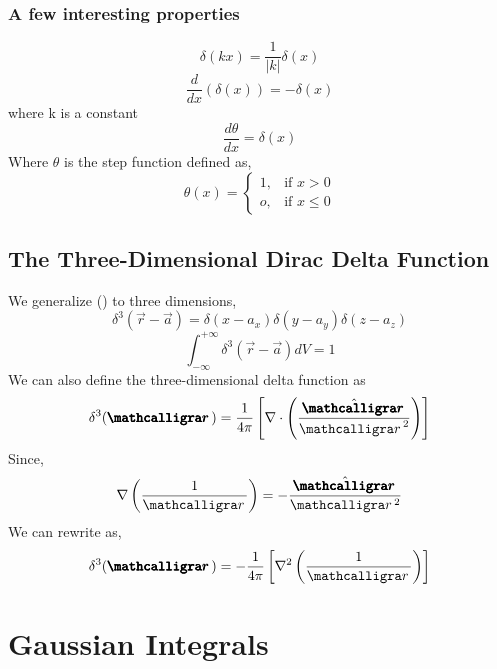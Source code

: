 \subsubsection{A few interesting properties}
\begin{equation}
\delta(kx) = \frac{1}{|k|}\delta(x)
\end{equation}
\begin{equation}
\frac{d}{dx}(\delta(x)) = -\delta(x)
\end{equation}
where k is a constant
\begin{equation}
\frac{d \theta}{dx} = \delta(x)
\end{equation}
Where $\theta$ is the step function defined as,
\begin{equation}
\theta(x)= 
\begin{cases}
1, & \text{if } x > 0\\
o,              & \text{if } x \leq 0
\end{cases}
\end{equation}

\subsection{The Three-Dimensional Dirac Delta Function}
We generalize () to three dimensions,
\begin{equation}
\delta^{3}(\vec{r} - \vec{a}) = \delta(x-a_{x})\delta(y-a_{y})\delta(z-a_{z})
\end{equation}
\begin{equation}
\int_{- \infty}^{+ \infty} \delta^{3}(\vec{r} - \vec{a}) dV = 1
\end{equation}
We can also define the three-dimensional delta function as
\begin{equation}
\delta^{3}(\boldscriptr) = \frac{1}{4 \pi} \left[\nabla \cdot \left( \frac{\hat{\boldscriptr}}{{\scriptr	}^{2}}\right)\right]
\end{equation}
Since,
$$\nabla \left(\frac{1}{\scriptr}\right) = -\frac{\hat{\boldscriptr}}{\scriptr^{2}}$$
We can rewrite as,
\begin{equation}
\delta^{3}(\boldscriptr) = -\frac{1}{4 \pi} \left[\nabla^{2}  \left( \frac{1}{\scriptr}\right)\right]
\end{equation}
\section{Gaussian Integrals}
